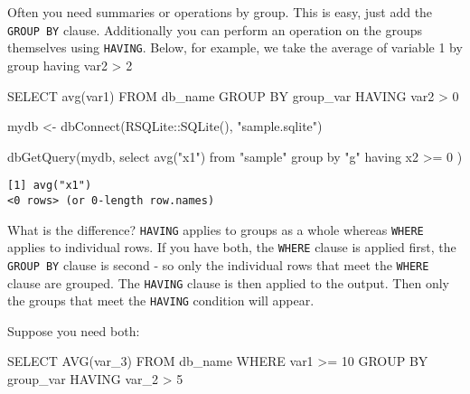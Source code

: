 \documentclass[
  letterpaper,
  DIV=11,
  numbers=noendperiod]{scrreprt}
\newenvironment{Shaded}{\begin{snugshade}}{\end{snugshade}}
\newcommand{\DecValTok}[1]{\textcolor[rgb]{0.68,0.00,0.00}{#1}}
\newcommand{\FunctionTok}[1]{\textcolor[rgb]{0.28,0.35,0.67}{#1}}
\newcommand{\KeywordTok}[1]{\textcolor[rgb]{0.00,0.23,0.31}{#1}}
\newcommand{\NormalTok}[1]{\textcolor[rgb]{0.00,0.23,0.31}{#1}}
\newcommand{\OperatorTok}[1]{\textcolor[rgb]{0.37,0.37,0.37}{#1}}
\newcommand{\OtherTok}[1]{\textcolor[rgb]{0.00,0.23,0.31}{#1}}
\newcommand{\SpecialCharTok}[1]{\textcolor[rgb]{0.37,0.37,0.37}{#1}}
\newcommand{\StringTok}[1]{\textcolor[rgb]{0.13,0.47,0.30}{#1}}
\begin{document}
Often you need summaries or operations by group. This is easy, just add
the \texttt{GROUP\ BY} clause. Additionally you can perform an operation
on the groups themselves using \texttt{HAVING}. Below, for example, we
take the average of variable 1 by group having var2 \textgreater{} 2

\begin{Shaded}
\begin{Highlighting}[]
\KeywordTok{SELECT} \FunctionTok{avg}\NormalTok{(var1)}
\KeywordTok{FROM}\NormalTok{ db\_name}
\KeywordTok{GROUP} \KeywordTok{BY}\NormalTok{ group\_var}
\KeywordTok{HAVING}\NormalTok{ var2 }\OperatorTok{\textgreater{}} \DecValTok{0}
\end{Highlighting}
\end{Shaded}

\begin{Shaded}
\begin{Highlighting}[]
\NormalTok{mydb }\OtherTok{\textless{}{-}} \FunctionTok{dbConnect}\NormalTok{(RSQLite}\SpecialCharTok{::}\FunctionTok{SQLite}\NormalTok{(), }\StringTok{"sample.sqlite"}\NormalTok{)}

\FunctionTok{dbGetQuery}\NormalTok{(mydb,}\StringTok{\textquotesingle{}}
\StringTok{  select avg("x1")}
\StringTok{  from "sample"}
\StringTok{  group by "g"}
\StringTok{  having x2 \textgreater{}= 0}
\StringTok{\textquotesingle{}}\NormalTok{)}
\end{Highlighting}
\end{Shaded}

\begin{verbatim}
[1] avg("x1")
<0 rows> (or 0-length row.names)
\end{verbatim}

What is the difference? \texttt{HAVING} applies to groups as a whole
whereas \texttt{WHERE} applies to individual rows. If you have both, the
\texttt{WHERE} clause is applied first, the \texttt{GROUP\ BY} clause is
second - so only the individual rows that meet the \texttt{WHERE} clause
are grouped. The \texttt{HAVING} clause is then applied to the output.
Then only the groups that meet the \texttt{HAVING} condition will
appear.

Suppose you need both:

\begin{Shaded}
\begin{Highlighting}[]
\KeywordTok{SELECT} \FunctionTok{AVG}\NormalTok{(var\_3)}
\KeywordTok{FROM}\NormalTok{ db\_name}
\KeywordTok{WHERE}\NormalTok{ var1 }\OperatorTok{\textgreater{}=} \DecValTok{10}
\KeywordTok{GROUP} \KeywordTok{BY}\NormalTok{ group\_var}
\KeywordTok{HAVING}\NormalTok{ var\_2 }\OperatorTok{\textgreater{}} \DecValTok{5}
\end{Highlighting}
\end{Shaded}
\end{document}
